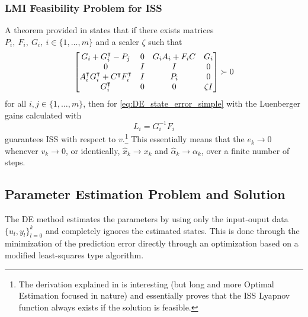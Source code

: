 \documentclass[]{ieeetran}
\begin{document}
\subsubsection{LMI Feasibility Problem for ISS}
A theorem provided in \cite{heemels2010} states that if there exists matrices $P_i,\ F_i,\ G_i,\ i \in \{1, \dots, m\}$ and a scaler $\zeta$ such that
\begin{equation}
	\mqty[G_i + G_i^\intercal - P_j			&0	&G_i A_i + F_i C	&G_i\\
		  0							&I	&I					&0\\
		  A_i^\intercal G_i^\intercal + C^\intercal F_i^\intercal	&I	&P_i				&0\\
		  G_i^\intercal						&0	&0					&\zeta I]
		  \succ 0
\end{equation}
for all $i, j \in \{1,\dots,m\}$, then for \eqref{eq:DE_state_error_simple} with the Luenberger gains calculated with
\begin{equation}
	L_i = G_i^{-1} F_i
\end{equation}
guarantees ISS with respect to $v$.\footnote{The derivation explained in \cite{heemels2010} is interesting (but long and more Optimal Estimation focused in nature) and essentially proves that the ISS Lyapnov function always exists if the solution is feasible.}
This essentially means that the $e_k \to 0$ whenever $v_k \to 0$, or identically, $\hat{x}_k \to x_k$ and $\hat{\alpha}_k \to \alpha_k$, over a finite number of steps.

\subsection{Parameter Estimation Problem and Solution}
The DE method estimates the parameters by using only the input-ouput data $\{u_l , y_l\}_{l=0}^k$ and completely ignores the estimated states. This is done through the minimization of the prediction error directly through an optimization based on a modified least-squares type algorithm.
\end{document}

